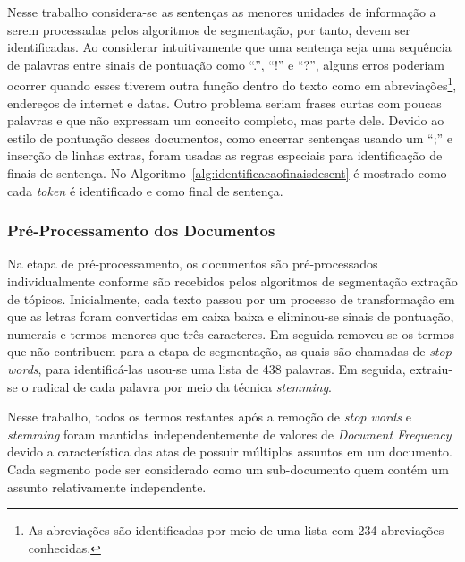 Nesse trabalho considera-se as sentenças as menores unidades de informação a serem processadas pelos algoritmos de segmentação, por tanto, devem ser identificadas. Ao considerar intuitivamente que uma sentença seja uma sequência de palavras entre sinais de pontuação como ``.'', ``!'' e ``?'', alguns erros poderiam ocorrer quando esses tiverem outra função dentro do texto como em abreviações\footnote{As abreviações são identificadas por meio de uma lista com 234 abreviações conhecidas.}, endereços de internet e datas. Outro problema seriam frases curtas com poucas palavras e que não expressam um conceito completo, mas parte dele. Devido ao estilo de pontuação desses documentos, como encerrar sentenças usando um ``;'' e inserção de linhas extras, foram usadas as regras especiais para identificação de finais de sentença. No Algoritmo~\ref{alg:identificacaofinaisdesent} é mostrado como cada \textit{token} é identificado e como final de sentença.  %







\subsubsection{Pré-Processamento dos Documentos}


Na etapa de pré-processamento, os documentos são pré-processados individualmente conforme são recebidos pelos algoritmos de segmentação extração de tópicos. Inicialmente, cada texto passou por um processo de transformação em que as letras foram convertidas em caixa baixa e eliminou-se sinais de pontuação, numerais e termos menores que três caracteres. Em seguida removeu-se os termos que não contribuem para a etapa de segmentação, as quais são chamadas de \textit{stop words}, para identificá-las usou-se uma lista de 438 palavras. Em seguida, extraiu-se o radical de cada palavra por meio da técnica \textit{stemming}. 

Nesse trabalho, todos os termos restantes após a remoção de \textit{stop words} e \textit{stemming} foram mantidas independentemente de valores de   \textit{Document Frequency} devido a característica das atas de possuir múltiplos assuntos em um documento. Cada segmento pode ser considerado como um sub-documento quem contém um assunto relativamente independente. 







